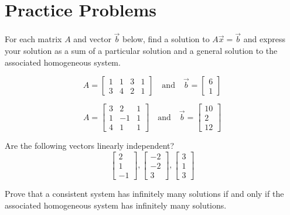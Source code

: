 \documentclass{ximera}
\begin{document}
\section*{Practice Problems}

\begin{problem}
For each matrix $A$ and vector $\vec{b}$ below, find a solution to $A\vec{x}=\vec{b}$ and  express your solution as a sum of a particular solution and a general solution to the associated homogeneous system.

\begin{problem}\label{prob:hompluspart1}
$$A=\begin{bmatrix}1&1&3&1\\3&4&2&1\end{bmatrix}\quad\text{and}\quad\vec{b}=\begin{bmatrix}6\\1\end{bmatrix}$$
\end{problem}

\begin{problem}\label{prob:hompluspart2}
$$A=\begin{bmatrix}3&2&1\\1&-1&1\\4&1&1\end{bmatrix}\quad\text{and}\quad\vec{b}=\begin{bmatrix}10\\2\\12\end{bmatrix}$$
\end{problem}
\end{problem}

\begin{problem}\label{prob:linindhom}
Are the following vectors linearly independent?
$$\begin{bmatrix}2\\1\\-1\end{bmatrix}, \begin{bmatrix}-2\\-2\\3\end{bmatrix}, \begin{bmatrix}3\\1\\3\end{bmatrix} $$
\end{problem}

\begin{problem}\label{prob:infmanysolutionshom}
Prove that a consistent system has infinitely many solutions if and only if the associated homogeneous system has infinitely many solutions.
\end{problem}
\end{document}
